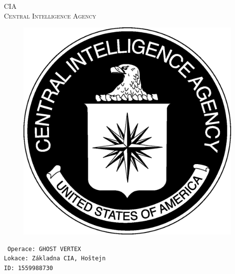 \documentclass[a4paper, \fontheight]{article}
\begin{document}
	\begin{titlepage}
		\begin{center}		
			\textsc{{\fontsize{80}{0}\selectfont CIA}\\[2em]
				\Huge Central Intelligence Agency\\[2.5em]}
				
			\begin{figure}[H]
				\centering
				\includegraphics[scale=0.6]{sources/CIA_logo.eps}
			\end{figure}
		\end{center}	
		\vfill
		\noindent
		\texttt{\LARGE
				Operace: GHOST VERTEX\\[0.4em]
				Lokace: Základna CIA, Hoštejn\\[0.4em]
				ID: 1559988730}	
\end{titlepage} 
\end{document}
